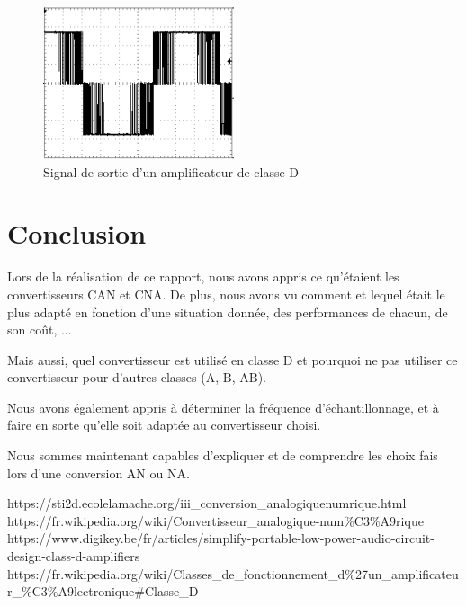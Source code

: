 \documentclass[a4paper]{article}
\begin{document}
\begin{figure}[H]
    \centering
    \includegraphics[width=0.5\textwidth]{images/PWM-signal.png}
    \caption{Signal de sortie d'un amplificateur de classe D}
    \label{fig:ampliD}
\end{figure}













\section{Conclusion}





Lors de la réalisation de ce rapport, nous avons appris ce qu’étaient les convertisseurs CAN et CNA. De plus, nous avons vu comment et lequel était le plus adapté en fonction d’une situation donnée, des performances de chacun, de son coût, ...

Mais aussi, quel convertisseur est utilisé en classe D et pourquoi ne pas utiliser ce convertisseur pour d’autres classes (A, B, AB).

Nous avons également appris à déterminer la fréquence d’échantillonnage, et à faire en sorte qu’elle soit adaptée au convertisseur choisi.

Nous sommes maintenant capables d’expliquer et de comprendre les choix fais lors d’une conversion AN ou NA.














\newpage \tableofcontents \listoffigures
\begin{thebibliography}{9}
 https://sti2d.ecolelamache.org/iii\_conversion\_analogiquenumrique.html
 https://fr.wikipedia.org/wiki/Convertisseur\_analogique-num\%C3\%A9rique
 https://www.digikey.be/fr/articles/simplify-portable-low-power-audio-circuit-design-class-d-amplifiers
 https://fr.wikipedia.org/wiki/Classes\_de\_fonctionnement\_d\%27un\_amplificateur\_\%C3\%A9lectronique\#Classe\_D
\end{thebibliography}
\end{document}
